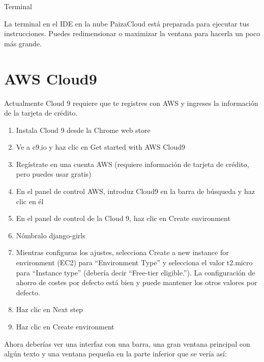 \documentclass[
  a4paper,
  DIV=11,
  numbers=noendperiod,
  onepage,
  openany]{scrreprt}
\newenvironment{Shaded}{\begin{snugshade}}{\end{snugshade}}
\newcommand{\ExtensionTok}[1]{\textcolor[rgb]{0.00,0.23,0.31}{#1}}
\newcommand{\NormalTok}[1]{\textcolor[rgb]{0.00,0.23,0.31}{#1}}
\providecommand{\tightlist}{%
  \setlength{\itemsep}{0pt}\setlength{\parskip}{0pt}}\usepackage{longtable,booktabs,array}
\begin{document}
\begin{tcolorbox}
Terminal

\begin{Shaded}
\begin{Highlighting}[]
\ExtensionTok{$}
\end{Highlighting}
\end{Shaded}

La terminal en el IDE en la nube PaizaCloud está preparada para ejecutar
tus instrucciones. Puedes redimensionar o maximizar la ventana para
hacerla un poco más grande.

\section{AWS Cloud9}\label{aws-cloud9}

Actualmente Cloud 9 requiere que te registres con AWS y ingreses la
información de la tarjeta de crédito.

\begin{enumerate}
\def\labelenumi{\arabic{enumi}.}
\tightlist
\item
  Instala Cloud 9 desde la Chrome web store
\item
  Ve a c9.io y haz clic en Get started with AWS Cloud9
\item
  Regístrate en una cuenta AWS (requiere información de tarjeta de
  crédito, pero puedes usar gratis)
\item
  En el panel de control AWS, introduz Cloud9 en la barra de búsqueda y
  haz clic en él
\item
  En el panel de control de la Cloud 9, haz clic en Create environment
\item
  Nómbralo django-girls
\item
  Mientras configuras los ajustes, selecciona Create a new instance for
  environment (EC2) para ``Environment Type'' y selecciona el valor
  t2.micro para ``Instance type'' (debería decir ``Free-tier
  eligible.''). La configuración de ahorro de costes por defecto está
  bien y puede mantener los otros valores por defecto.
\item
  Haz clic en Next step
\item
  Haz clic en Create environment
\end{enumerate}

Ahora deberías ver una interfaz con una barra, una gran ventana
principal con algún texto y una ventana pequeña en la parte inferior que
se vería así:

\begin{Shaded}
\end{Shaded}


\end{tcolorbox}
\end{document}
